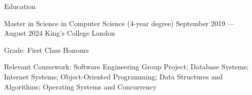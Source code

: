 \begin{rSection}{Education}

    \begin{rEducationSubsection}
        {Master in Science in Computer Science (4-year degree)}
        {September 2019 --- August 2024}
        {King's College London}
        {
            \item Grade: First Class Honours
            \item Relevant Coursework: Software Engineering Group Project; Database Systems; Internet Systems; Object-Oriented Programming; Data Structures and Algorithms; Operating Systems and Concurrency
        }
    \end{rEducationSubsection}

\end{rSection}
